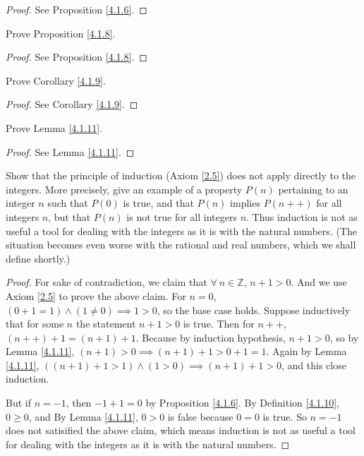 \begin{proof}
See Proposition \ref{4.1.6}.
\end{proof}

\begin{exercise}\label{ex 4.1.5}
Prove Proposition \ref{4.1.8}.
\end{exercise}

\begin{proof}
See Proposition \ref{4.1.8}.
\end{proof}

\begin{exercise}\label{ex 4.1.6}
Prove Corollary \ref{4.1.9}.
\end{exercise}

\begin{proof}
See Corollary \ref{4.1.9}.
\end{proof}

\begin{exercise}\label{ex 4.1.7}
Prove Lemma \ref{4.1.11}.
\end{exercise}

\begin{proof}
See Lemma \ref{4.1.11}.
\end{proof}

\begin{exercise}\label{ex 4.1.8}
Show that the principle of induction (Axiom \ref{2.5}) does not apply directly to the integers.
More precisely, give an example of a property \(P(n)\) pertaining to an integer \(n\) such that \(P(0)\) is true, and that \(P(n)\) implies \(P(n++)\) for all integers \(n\), but that \(P(n)\) is not true for all integers \(n\).
Thus induction is not as useful a tool for dealing with the integers as it is with the natural numbers.
(The situation becomes even worse with the rational and real numbers, which we shall define shortly.)
\end{exercise}

\begin{proof}
For sake of contradiction, we claim that \(\forall\ n \in \mathds{Z}\), \(n + 1 > 0\).
And we use Axiom \ref{2.5} to prove the above claim.
For \(n = 0\), \((0 + 1 = 1) \land (1 \neq 0) \implies 1 > 0\), so the base case holds.
Suppose inductively that for some \(n\) the statement \(n + 1 > 0\) is true.
Then for \(n++\), \((n++) + 1 = (n + 1) + 1\).
Because by induction hypothesis, \(n + 1 > 0\), so by Lemma \ref{4.1.11}, \((n + 1) > 0 \implies (n + 1) + 1 > 0 + 1 = 1\).
Again by Lemma \ref{4.1.11}, \(((n + 1) + 1 > 1) \land (1 > 0) \implies (n + 1) + 1 > 0\), and this close induction.

But if \(n = -1\), then \(-1 + 1 = 0\) by Proposition \ref{4.1.6}.
By Definition \ref{4.1.10}, \(0 \geq 0\), and By Lemma \ref{4.1.11}, \(0 > 0\) is false because \(0 = 0\) is true.
So \(n = -1\) does not satisified the above claim, which means induction is not as useful a tool for dealing with the integers as it is with the natural numbers.
\end{proof}